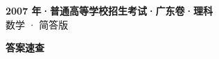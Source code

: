\documentclass[zihao=-4, a4paper]{ctexart}
\begin{document}
\begin{center}
  {\Large\bfseries 2007 年·普通高等学校招生考试·广东卷·理科}\\[4pt]
  {\large 数学 · 简答版}
\end{center}
\medskip
{}

\clearpage
{}
\begin{center}{\Large\bfseries 答案速查}\end{center}
\medskip

\end{document}
